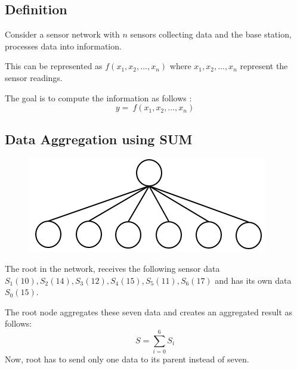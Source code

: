 \documentclass[%
  slidesonly,%
  semlayer%
  ]{seminar}                                  %
\begin{document}
\begin{slide}
  \subsection*{Definition}
      \vfill
      Consider a sensor network with $n$ sensors collecting data and the base station, processes data into information. 
      
      This can be represented as $f(x_{1}, x_{2},...,x_{n})$ where $x_{1}, x_{2},..., x_{n}$ represent the sensor readings.
      

      The goal is to compute the information as follows :
      \begin{equation*}
        y =\ f(x_{1}, x_{2},...,x_{n})
      \end{equation*}
      \vfill
      \clearpage

  \subsection*{Data Aggregation using SUM}
    \vfill      
    \begin{figure}
      \centering
      \includegraphics[scale = 0.4]{images/star-tree.png}
    \end{figure}

    The root in the network, receives the following sensor data $S_{1}(10), S_{2}(14), S_{3}(12), S_{4}(15), S_{5}(11),S_{6}(17)$ and has its own data $S_{0}(15)$. 

    The root node aggregates these seven data and creates an aggregated result as follows:
    \begin{equation}
      S = \sum_{i=0}^6 S_{i}
    \end{equation}
    Now, root has to send only one data to its parent instead of seven.
    \vfill
    \clearpage



\end{slide}
\end{document}

